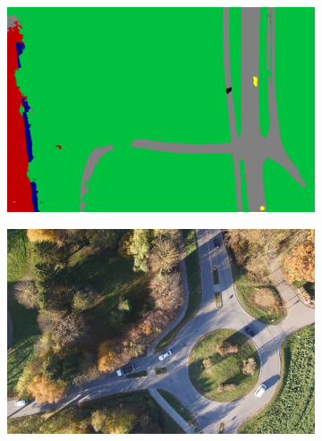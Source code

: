 \begin{figure}[htb]
\begin{subfigure}{0.32\columnwidth}
\end{subfigure}
\begin{subfigure}{0.32\columnwidth}
  \centering
  \includegraphics[width=1\linewidth]{fig/segmentation/DSC00991_auto.png}
\end{subfigure}


\begin{subfigure}{0.32\columnwidth}
  \centering
  \includegraphics[width=1\linewidth]{fig/segmentation/DSC01001.JPG}


\end{subfigure}
\end{figure}
